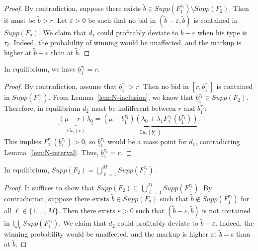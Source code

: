 \begin{proof}
By contradiction, suppose there exists $\tilde{b} \in Supp(F_1^{\tau_\ell}) \setminus Supp(F_2)$. Then it must be $\tilde{b} > r$. Let $\varepsilon > 0$ be such that no bid in $(\tilde{b} - \varepsilon, \tilde{b})$ is contained in $Supp(F_2)$. We claim that $d_1$ could profitably deviate to $\tilde{b} - \varepsilon$ when his type is $\tau_\ell$. Indeed, the probability of winning would be unaffected, and the markup is higher at $\tilde{b} - \varepsilon$ than at $\tilde{b}$.
\end{proof}

\begin{lem}\label{lem:N-lowest}
In equilibrium, we have $\underline{b}_1^{\tau_1} = r$.
\end{lem}

\begin{proof}
By contradiction, assume that $\underline{b}_1^{\tau_1} > r$. Then no bid in $[r, \underline{b}_1^{\tau_1}]$ is contained in $Supp(F_1^{\tau_1})$. From Lemma~\ref{lem:N-inclusion}, we know that $\underline{b}_1^{\tau_1} \in Supp(F_2)$. Therefore, in equilibrium $d_2$ must be indifferent between $r$ and $\underline{b}_1^{\tau_1}$:
\[
\underbrace{(\mu - r) \lambda_0}_{\mathbb{E}\tilde{u}_2(r)} = \underbrace{(\mu - \underline{b}_1^{\tau_1}) \left( \lambda_0 + \lambda_1 F_1^{\tau_1}(\underline{b}_1^{\tau_1}) \right)}_{\mathbb{E}\tilde{u}_2(\underline{b}_1^{\tau_1})}.
\]
This implies $F_1^{\tau_1}(\underline{b}_1^{\tau_1}) > 0$, so $\underline{b}_1^{\tau_1}$ would be a mass point for $d_1$, contradicting Lemma~\ref{lem:N-interval}. Thus, $\underline{b}_1^{\tau_1} = r$.
\end{proof}

\begin{lem}\label{lem:N-union}
In equilibrium, $Supp(F_2) = \bigcup_{\ell=1}^{M} Supp(F_1^{\tau_\ell})$.
\end{lem}

\begin{proof}
It suffices to show that $Supp(F_2) \subseteq \bigcup_{\ell=1}^{M} Supp(F_1^{\tau_\ell})$. By contradiction, suppose there exists $\tilde{b} \in Supp(F_2)$ such that $\tilde{b} \notin Supp(F_1^{\tau_\ell})$ for all $\ell \in \{1, \ldots, M\}$. Then there exists $\varepsilon > 0$ such that $(\tilde{b} - \varepsilon, \tilde{b})$ is not contained in $\bigcup_{\ell} Supp(F_1^{\tau_\ell})$. We claim that $d_2$ could profitably deviate to $\tilde{b} - \varepsilon$. Indeed, the winning probability would be unaffected, and the markup is higher at $\tilde{b} - \varepsilon$ than at $\tilde{b}$.
\end{proof}

